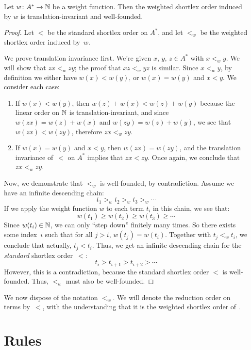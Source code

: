 \documentclass[../generics]{subfiles}
\begin{document}
\begin{proposition} Let $w\colon A^*\rightarrow\mathbb{N}$ be a weight function. Then the weighted shortlex order induced by $w$ is translation-invariant and well-founded.
\end{proposition}
\begin{proof}
Let $<$ be the standard shortlex order on $A^*$, and let $<_w$ be the weighted shortlex order induced by~$w$.

We prove translation invariance first. We're given $x$, $y$, $z\in A^*$ with $x<_w y$. We will show that $zx<_w zy$; the proof that $xz<_w yz$ is similar. Since $x<_w y$, by definition we either have $w(x)<w(y)$, or $w(x)=w(y)$ and $x<y$. We consider each case:
\begin{enumerate}
\item If $w(x)<w(y)$, then $w(z)+w(x)<w(z)+w(y)$ because the linear order on $\mathbb{N}$ is translation-invariant, and since $w(zx)=w(z)+w(x)$ and $w(zy)=w(z)+w(y)$, we see that $w(zx)<w(zy)$, therefore $zx <_w zy$.
\item If $w(x)=w(y)$ and $x<y$, then $w(zx)=w(zy)$, and the translation invariance of~$<$ on $A^*$ implies that $zx<zy$. Once again, we conclude that $zx <_w zy$.
\end{enumerate}
Now, we demonstrate that $<_w$ is well-founded, by contradiction. Assume we have an infinite descending chain:
\[ t_1 >_w t_2 >_w t_3 >_w \cdots \]
If we apply the weight function $w$ to each term $t_i$ in this chain, we see that:
\[ w(t_1) \geq w(t_2) \geq w(t_3) \geq \cdots \]
Since $w(t_i)\in\mathbb{N}$, we can only ``step down'' finitely many times. So there exists some index~$i$ such that for all $j>i$, $w(t_j)=w(t_i)$. Together with $t_j <_w t_i$, we conclude that actually, $t_j < t_i$. Thus, we get an infinite descending chain for the \emph{standard} shortlex order~$<$:
\[ t_i > t_{i+1} > t_{i+2} > \cdots \]
However, this is a contradiction, because the standard shortlex order $<$ is well-founded. Thus, $<_w$ must also be well-founded.
\end{proof}
We now dispose of the notation $<_w$. We will denote the reduction order on terms by~$<$, with the understanding that it is the weighted shortlex order of .

\section{Rules}\label{building rules}
\end{document}
